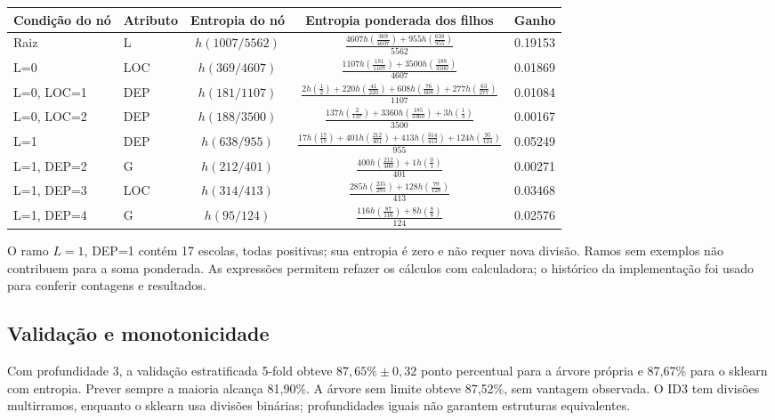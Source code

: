 \documentclass[10pt,a4paper]{article}
\begin{document}
\begin{center}\scriptsize
\setlength{\tabcolsep}{3pt}\renewcommand{\arraystretch}{1.6}
\begin{tabular}{llccc}\toprule
Condição do nó & Atributo & Entropia do nó & Entropia ponderada dos filhos & Ganho\\\midrule
Raiz & L & $h(1007/5562)$ & $\frac{4607h\!\left(\frac{369}{4607}\right)+955h\!\left(\frac{638}{955}\right)}{5562}$ & 0.19153 \\
L=0 & LOC & $h(369/4607)$ & $\frac{1107h\!\left(\frac{181}{1107}\right)+3500h\!\left(\frac{188}{3500}\right)}{4607}$ & 0.01869 \\
L=0, LOC=1 & DEP & $h(181/1107)$ & $\frac{2h\!\left(\frac{1}{2}\right)+220h\!\left(\frac{41}{220}\right)+608h\!\left(\frac{76}{608}\right)+277h\!\left(\frac{63}{277}\right)}{1107}$ & 0.01084 \\
L=0, LOC=2 & DEP & $h(188/3500)$ & $\frac{137h\!\left(\frac{2}{137}\right)+3360h\!\left(\frac{185}{3360}\right)+3h\!\left(\frac{1}{3}\right)}{3500}$ & 0.00167 \\
L=1 & DEP & $h(638/955)$ & $\frac{17h\!\left(\frac{17}{17}\right)+401h\!\left(\frac{212}{401}\right)+413h\!\left(\frac{314}{413}\right)+124h\!\left(\frac{95}{124}\right)}{955}$ & 0.05249 \\
L=1, DEP=2 & G & $h(212/401)$ & $\frac{400h\!\left(\frac{212}{400}\right)+1h\!\left(\frac{0}{1}\right)}{401}$ & 0.00271 \\
L=1, DEP=3 & LOC & $h(314/413)$ & $\frac{285h\!\left(\frac{235}{285}\right)+128h\!\left(\frac{79}{128}\right)}{413}$ & 0.03468 \\
L=1, DEP=4 & G & $h(95/124)$ & $\frac{116h\!\left(\frac{87}{116}\right)+8h\!\left(\frac{8}{8}\right)}{124}$ & 0.02576 \\

\bottomrule\end{tabular}\end{center}
O ramo $L=1$, DEP=1 contém 17 escolas, todas positivas; sua entropia é zero e não requer nova divisão. Ramos sem exemplos não contribuem para a soma ponderada. As expressões permitem refazer os cálculos com calculadora; o histórico da implementação foi usado para conferir contagens e resultados.

\subsection{Validação e monotonicidade}
Com profundidade 3, a validação estratificada 5-fold obteve $87,65\%\pm0,32$ ponto percentual para a árvore própria e 87,67\% para o sklearn com entropia. Prever sempre a maioria alcança 81,90\%. A árvore sem limite obteve 87,52\%, sem vantagem observada. O ID3 tem divisões multirramos, enquanto o sklearn usa divisões binárias; profundidades iguais não garantem estruturas equivalentes.
\end{document}
